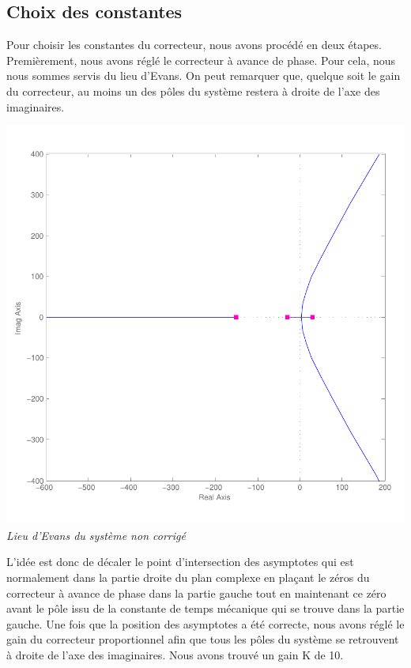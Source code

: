\documentclass[11pt, french]{article} %
\begin{document}
\subsection{Choix des constantes}

Pour choisir les constantes du correcteur, nous avons procédé en deux étapes. Premièrement, nous avons réglé le correcteur à avance de phase. Pour cela, nous nous sommes servis du lieu d'Evans. On peut remarquer que, quelque soit le gain du correcteur, au moins un des pôles du système restera à droite de l'axe des imaginaires.

\begin{center}
\includegraphics [scale=0.50]{RL_Sys_Seul.pdf}
\\
\emph{Lieu d'Evans du système non corrigé}
\end{center}

L'idée est donc de décaler le point d'intersection des asymptotes qui est normalement dans la partie droite du plan complexe en plaçant le zéros du correcteur à avance de phase dans la partie gauche tout en maintenant ce zéro avant le pôle issu de la constante de temps mécanique qui se trouve dans la partie gauche. Une fois que la position des asymptotes a été correcte, nous avons réglé le gain du correcteur proportionnel afin que tous les pôles du système se retrouvent à droite de l'axe des imaginaires. Nous avons trouvé un gain K de 10. 
\end{document}
